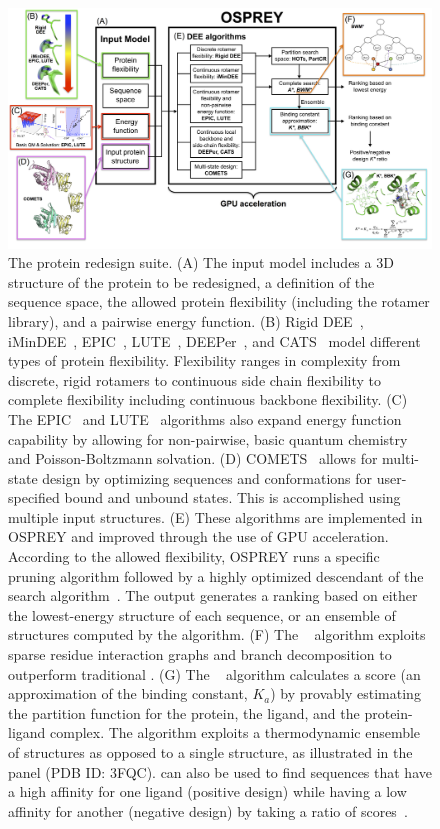 \begin{figure}
\center
\includegraphics[width=6in]{figures/osprey_mantra.png}
 \vspace{-0.3in}%
\caption{The \osprey protein redesign suite. (A) The input model includes a 3D structure of the protein to be redesigned, a definition of the sequence space, the allowed protein flexibility (including the rotamer library), and a pairwise energy function. (B) Rigid DEE~\cite{DEE,DEE/A*}, iMinDEE~\cite{iMinDEE}, EPIC~\cite{EPIC}, LUTE~\cite{LUTE_RECOMB}, DEEPer~\cite{DEEPer}, and CATS~\cite{CATS} model different types of protein flexibility. Flexibility ranges in complexity from discrete, rigid rotamers to continuous side chain flexibility to complete flexibility including continuous backbone flexibility. (C) The EPIC~\cite{EPIC} and LUTE~\cite{LUTE_RECOMB} algorithms also expand energy function capability by allowing for non-pairwise, basic quantum chemistry and Poisson-Boltzmann solvation. (D) COMETS~\cite{COMETS} allows for multi-state design by optimizing sequences and conformations for user-specified bound and unbound states. This is accomplished using multiple input structures. (E) These algorithms are implemented in OSPREY and improved through the use of GPU acceleration. According to the allowed flexibility, OSPREY runs a specific pruning algorithm followed by a highly optimized descendant of the \as search algorithm~\cite{dynamic_A*}. The \as output generates a ranking based on either the lowest-energy structure of each sequence, or an ensemble of structures computed by the \ks algorithm. (F) The \bwmstar~\cite{BWM*} algorithm exploits sparse residue interaction graphs and branch decomposition to outperform traditional \as. (G) The \ks~\cite{K*,minDEE} algorithm calculates a \ks score (an approximation of the binding constant, $K_a$) by provably estimating the partition function for the protein, the ligand, and the protein-ligand complex. The \ks algorithm exploits a thermodynamic ensemble of structures as opposed to a single structure, as illustrated in the panel (PDB ID: 3FQC). \ks can also be used to find sequences that have a high affinity for one ligand (positive design) while having a low affinity for another (negative design) by taking a ratio of \ks scores~\cite{DHFR-PNAS,DHFR-PNAS2}. }
\label{flowchart}
\end{figure}

